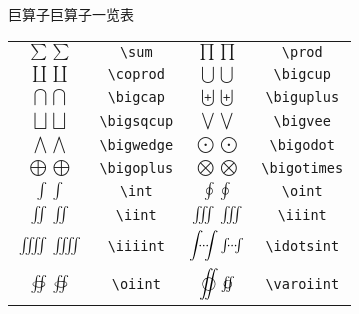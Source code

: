 \documentclass[mathserif]{beamer}
\begin{document}
\begin{frame}[fragile]{巨算子}{巨算子一览表}
\begin{table}[H]
\centering
\begin{tabular}{cc|cc}
	\toprule
	$\displaystyle \sum \textstyle \sum$ & \lstinline'\sum' & $\displaystyle \prod \textstyle \prod$ & \lstinline'\prod' \\
	$\displaystyle \coprod \textstyle \coprod$ & \lstinline'\coprod' & $\displaystyle \bigcup \textstyle \bigcup$ & \lstinline'\bigcup' \\
	$\displaystyle \bigcap \textstyle \bigcap$ & \lstinline'\bigcap' & $\displaystyle \biguplus \textstyle \biguplus$ & \lstinline'\biguplus' \\
	$\displaystyle \bigsqcup \textstyle \bigsqcup$ & \lstinline'\bigsqcup' & $\displaystyle \bigvee \textstyle \bigvee$ & \lstinline'\bigvee' \\
	$\displaystyle \bigwedge \textstyle \bigwedge$ & \lstinline'\bigwedge' & $\displaystyle \bigodot \textstyle \bigodot$ & \lstinline'\bigodot' \\
	$\displaystyle \bigoplus \textstyle \bigoplus$ & \lstinline'\bigoplus' & $\displaystyle \bigotimes \textstyle \bigotimes$ & \lstinline'\bigotimes' \\
	$\displaystyle \int \textstyle \int$ & \lstinline'\int' & $\displaystyle \oint \textstyle \oint$ & \lstinline'\oint' \\
	$\displaystyle \iint \textstyle \iint$ & \lstinline'\iint' & $\displaystyle \iiint \textstyle \iiint$ & \lstinline'\iiint' \\
	$\displaystyle \iiiint \textstyle \iiiint$ & \lstinline'\iiiint' & $\displaystyle \idotsint \textstyle \idotsint$ & \lstinline'\idotsint' \\
	$\displaystyle \oiint \textstyle \oiint$ & \lstinline'\oiint' & $\displaystyle \varoiint \textstyle \varoiint$ & \lstinline'\varoiint' \\
	\bottomrule
\end{tabular}
\end{table}
\end{frame}
\end{document}
